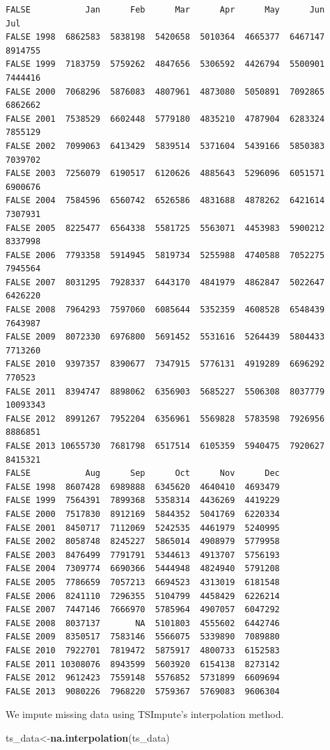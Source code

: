 \documentclass[openany]{book}
\newenvironment{Shaded}{\begin{snugshade}}{\end{snugshade}}
\newcommand{\KeywordTok}[1]{\textcolor[rgb]{0.13,0.29,0.53}{\textbf{#1}}}
\newcommand{\NormalTok}[1]{#1}
\begin{document}
\begin{verbatim}
FALSE           Jan      Feb      Mar      Apr      May      Jun      Jul
FALSE 1998  6862583  5838198  5420658  5010364  4665377  6467147  8914755
FALSE 1999  7183759  5759262  4847656  5306592  4426794  5500901  7444416
FALSE 2000  7068296  5876083  4807961  4873080  5050891  7092865  6862662
FALSE 2001  7538529  6602448  5779180  4835210  4787904  6283324  7855129
FALSE 2002  7099063  6413429  5839514  5371604  5439166  5850383  7039702
FALSE 2003  7256079  6190517  6120626  4885643  5296096  6051571  6900676
FALSE 2004  7584596  6560742  6526586  4831688  4878262  6421614  7307931
FALSE 2005  8225477  6564338  5581725  5563071  4453983  5900212  8337998
FALSE 2006  7793358  5914945  5819734  5255988  4740588  7052275  7945564
FALSE 2007  8031295  7928337  6443170  4841979  4862847  5022647  6426220
FALSE 2008  7964293  7597060  6085644  5352359  4608528  6548439  7643987
FALSE 2009  8072330  6976800  5691452  5531616  5264439  5804433  7713260
FALSE 2010  9397357  8390677  7347915  5776131  4919289  6696292   770523
FALSE 2011  8394747  8898062  6356903  5685227  5506308  8037779 10093343
FALSE 2012  8991267  7952204  6356961  5569828  5783598  7926956  8886851
FALSE 2013 10655730  7681798  6517514  6105359  5940475  7920627  8415321
FALSE           Aug      Sep      Oct      Nov      Dec
FALSE 1998  8607428  6989888  6345620  4640410  4693479
FALSE 1999  7564391  7899368  5358314  4436269  4419229
FALSE 2000  7517830  8912169  5844352  5041769  6220334
FALSE 2001  8450717  7112069  5242535  4461979  5240995
FALSE 2002  8058748  8245227  5865014  4908979  5779958
FALSE 2003  8476499  7791791  5344613  4913707  5756193
FALSE 2004  7309774  6690366  5444948  4824940  5791208
FALSE 2005  7786659  7057213  6694523  4313019  6181548
FALSE 2006  8241110  7296355  5104799  4458429  6226214
FALSE 2007  7447146  7666970  5785964  4907057  6047292
FALSE 2008  8037137       NA  5101803  4555602  6442746
FALSE 2009  8350517  7583146  5566075  5339890  7089880
FALSE 2010  7922701  7819472  5875917  4800733  6152583
FALSE 2011 10308076  8943599  5603920  6154138  8273142
FALSE 2012  9612423  7559148  5576852  5731899  6609694
FALSE 2013  9080226  7968220  5759367  5769083  9606304
\end{verbatim}

We impute missing data using TSImpute's interpolation method.

\begin{Shaded}
\begin{Highlighting}[]
\NormalTok{ts_data<-}\KeywordTok{na.interpolation}\NormalTok{(ts_data)}
\end{Highlighting}
\end{Shaded}
\end{document}
